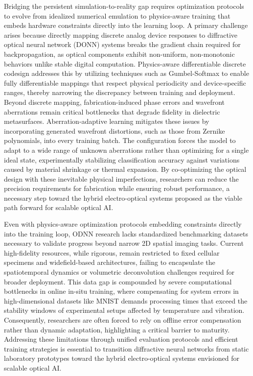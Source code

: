 \documentclass[11pt]{article}
\begin{document}
Bridging the persistent simulation-to-reality gap requires optimization protocols to evolve from idealized numerical emulation to physics-aware training that embeds hardware constraints directly into the learning loop. A primary challenge arises because directly mapping discrete analog device responses to diffractive optical neural network (DONN) systems breaks the gradient chain required for backpropagation, as optical components exhibit non-uniform, non-monotonic behaviors unlike stable digital computation. Physics-aware differentiable discrete codesign addresses this by utilizing techniques such as Gumbel-Softmax to enable fully differentiable mappings that respect physical periodicity and device-specific ranges, thereby narrowing the discrepancy between training and deployment. \citep{doi_10_1145_3508352_3549378_13c53996} Beyond discrete mapping, fabrication-induced phase errors and wavefront aberrations remain critical bottlenecks that degrade fidelity in dielectric metasurfaces. Aberration-adaptive learning mitigates these issues by incorporating generated wavefront distortions, such as those from Zernike polynomials, into every training batch. \citep{s2_8560e3428b029604da9bd494e485939165b3777e_bf7326ee} The configuration forces the model to adapt to a wide range of unknown aberrations rather than optimizing for a single ideal state, experimentally stabilizing classification accuracy against variations caused by material shrinkage or thermal expansion. By co-optimizing the optical design with these inevitable physical imperfections, researchers can reduce the precision requirements for fabrication while ensuring robust performance, a necessary step toward the hybrid electro-optical systems proposed as the viable path forward for scalable optical AI. \citep{doi_10_1145_3508352_3549378_13c53996} \citep{s2_8560e3428b029604da9bd494e485939165b3777e_bf7326ee} \citep{doi_10_1063_5_0141881_93942631}

Even with physics-aware optimization protocols embedding constraints directly into the training loop, ODNN research lacks standardized benchmarking datasets necessary to validate progress beyond narrow 2D spatial imaging tasks. Current high-fidelity resources, while rigorous, remain restricted to fixed cellular specimens and widefield-based architectures, failing to encapsulate the spatiotemporal dynamics or volumetric deconvolution challenges required for broader deployment. This data gap is compounded by severe computational bottlenecks in online in-situ training, where compensating for system errors in high-dimensional datasets like MNIST demands processing times that exceed the stability windows of experimental setups affected by temperature and vibration. Consequently, researchers are often forced to rely on offline error compensation rather than dynamic adaptation, highlighting a critical barrier to maturity. Addressing these limitations through unified evaluation protocols and efficient training strategies is essential to transition diffractive neural networks from static laboratory prototypes toward the hybrid electro-optical systems envisioned for scalable optical AI. \citep{doi_10_1038_s41597_026_07467_x_ae097478} \citep{s2_dac795899d5e98d409739c3bcfe096491d6b7427_5b5c8d05}
\end{document}
